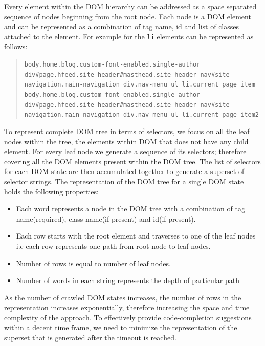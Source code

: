 		Every element within the DOM hierarchy can be addressed as a space separated sequence of nodes beginning from the root node. Each node is a DOM element and can be represented as a combination of tag name, id and list of classes attached to the element. For example for  the \texttt{li} elements can be represented as follows:
			
		\begin{quote}
			\texttt{body.home.blog.custom-font-enabled.single-author div\#page.hfeed.site header\#masthead.site-header nav\#site-navigation.main-navigation div.nav-menu ul li.current\_page\_item} \\
			
			\texttt{body.home.blog.custom-font-enabled.single-author div\#page.hfeed.site header\#masthead.site-header nav\#site-navigation.main-navigation div.nav-menu ul li.current\_page\_item2}
		\end{quote}
			
		To represent complete DOM tree in terms of \css selectors, we focus on all the leaf nodes within the tree, \ie the elements within DOM that does not have any child element. For every leaf node we generate a sequence of its \css selectors; therefore covering all the DOM elements present within the DOM tree. The list of \css selectors for each DOM state are then accumulated together to generate a superset of \css selector strings. The \css representation of the DOM tree for a single DOM state holds the following properties:
		\begin{itemize}
			 \item Each word represents a node in the DOM tree with a combination of tag name(required), class name(if present) and id(if present).
			 \item Each row starts with the root element and traverses to one of the leaf nodes i.e each row represents one path from root node to leaf nodes.
			\item Number of rows is equal to number of leaf nodes.
			 \item Number of words in each string represents the depth of particular path
		\end{itemize}
		
		As the number of crawled DOM states increases, the number of rows in the \css representation increases exponentially, therefore increasing the space and time complexity of the approach. To effectively provide code-completion suggestions within a decent time frame, we need to minimize the \css representation of the superset that is generated after the timeout is reached.
		
